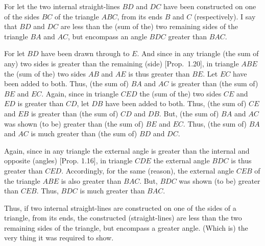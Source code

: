 \begin{Parallel}{}{}
{\epsfysize=1.5in
\centerline{}

For let the two internal straight-lines $BD$ and $DC$ have been constructed on one of the sides $BC$ of the triangle $ABC$, from its ends $B$ and $C$ (respectively). I say that 
$BD$ and $DC$ are less than the (sum of the) two  remaining sides of the triangle
$BA$ and $AC$, but encompass an angle $BDC$ greater than $BAC$.

For let $BD$ have been drawn through to $E$. And since in any
triangle (the sum of any) two sides is greater than the remaining (side) [Prop.~1.20],
 in triangle $ABE$ the  (sum of the) two sides $AB$ and $AE$ is thus  greater than
$BE$. Let $EC$ have been added to both. Thus, (the sum of) $BA$ and $AC$ is greater
than (the sum of) $BE$ and $EC$.  Again, since in triangle $CED$ the (sum of the) two sides $CE$ and $ED$
is  greater than $CD$, let $DB$ have been added to both. Thus, 
(the sum of) $CE$ and $EB$ is greater than  (the sum of) $CD$ and $DB$. But, (the sum of) $BA$ and $AC$ was shown
(to be) greater than (the sum of) $BE$
 and $EC$. Thus, (the sum of) $BA$ and $AC$ is much greater than
(the sum of) $BD$ and $DC$.

Again, since in any  triangle the external angle 
is greater than the internal and opposite (angles) [Prop. 1.16],
 in triangle $CDE$ the external angle $BDC$ is thus greater
than $CED$.  Accordingly, for the same (reason),  the external angle $CEB$ of the
triangle $ABE$ is also greater than $BAC$. But, $BDC$ was shown (to be) 
greater
than $CEB$. Thus, $BDC$ is much greater than $BAC$.

Thus, if two internal straight-lines are constructed on one of the sides
of a triangle, from its ends, 
the constructed (straight-lines) are less than the two remaining 
sides of the triangle, but  encompass a greater angle. (Which is) the
very thing it was required to show.}
\end{Parallel}

